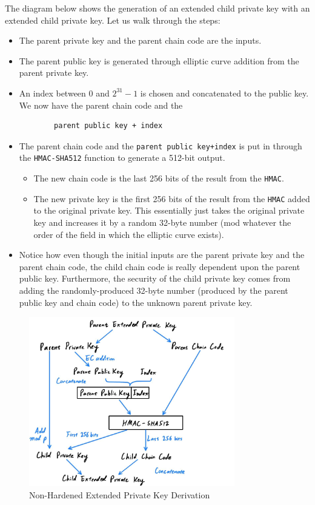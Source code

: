 \documentclass{article}
\begin{document}
    The diagram below shows the generation of an extended child private key with an extended child private key. Let us walk through the steps:

    \begin{itemize}
      \item The parent private key and the parent chain code are the inputs.
      \item The parent public key is generated through elliptic curve addition from the parent private key.
      \item An index between $0$ and $2^{31}-1$ is chosen and concatenated to the public key. We now have the parent chain code and the
      \begin{lstlisting}
        parent public key + index
      \end{lstlisting}
      \item The parent chain code and the \texttt{parent public key+index} is put in through the \texttt{HMAC-SHA512} function to generate a 512-bit output.
      \begin{itemize}
        \item The new chain code is the last 256 bits of the result from the \texttt{HMAC}.
        \item The new private key is the first 256 bits of the result from the \texttt{HMAC} added to the original private key. This essentially just takes the original private key and increases it by a random 32-byte number (mod whatever the order of the field in which the elliptic curve exists).
      \end{itemize}
      \item Notice how even though the initial inputs are the parent private key and the parent chain code, the child chain code is really dependent upon the parent public key. Furthermore, the security of the child private key comes from adding the randomly-produced 32-byte number (produced by the parent public key and chain code) to the unknown parent private key.
    \end{itemize}

    \begin{figure}[H]
    \centering
    \includegraphics[width=0.8\textwidth]{img/Private CKD.jpg}
    \caption{Non-Hardened Extended Private Key Derivation}
    \end{figure}
\end{document}
